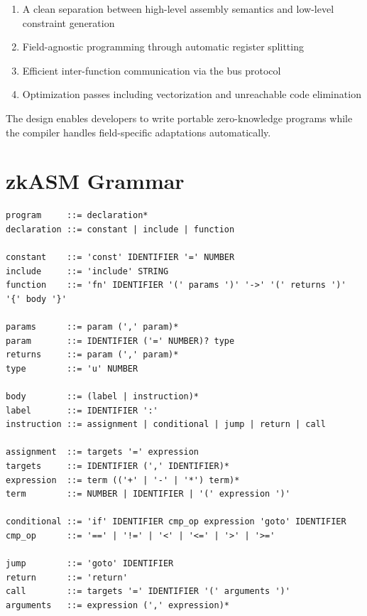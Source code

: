 \documentclass[11pt,a4paper]{article}
\begin{document}
\begin{enumerate}
    \item A clean separation between high-level assembly semantics and low-level constraint generation
    \item Field-agnostic programming through automatic register splitting
    \item Efficient inter-function communication via the bus protocol
    \item Optimization passes including vectorization and unreachable code elimination
\end{enumerate}

The design enables developers to write portable zero-knowledge programs while the compiler handles field-specific adaptations automatically.

\appendix
\section{zkASM Grammar}

\begin{verbatim}
program     ::= declaration*
declaration ::= constant | include | function

constant    ::= 'const' IDENTIFIER '=' NUMBER
include     ::= 'include' STRING
function    ::= 'fn' IDENTIFIER '(' params ')' '->' '(' returns ')' '{' body '}'

params      ::= param (',' param)*
param       ::= IDENTIFIER ('=' NUMBER)? type
returns     ::= param (',' param)*
type        ::= 'u' NUMBER

body        ::= (label | instruction)*
label       ::= IDENTIFIER ':'
instruction ::= assignment | conditional | jump | return | call

assignment  ::= targets '=' expression
targets     ::= IDENTIFIER (',' IDENTIFIER)*
expression  ::= term (('+' | '-' | '*') term)*
term        ::= NUMBER | IDENTIFIER | '(' expression ')'

conditional ::= 'if' IDENTIFIER cmp_op expression 'goto' IDENTIFIER
cmp_op      ::= '==' | '!=' | '<' | '<=' | '>' | '>='

jump        ::= 'goto' IDENTIFIER
return      ::= 'return'
call        ::= targets '=' IDENTIFIER '(' arguments ')'
arguments   ::= expression (',' expression)*
\end{verbatim}
\end{document}
